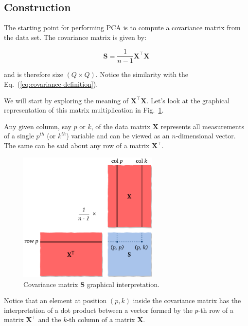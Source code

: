 \documentclass[10pt,twocolumn]{article}
\begin{document}
\subsection{Construction}

The starting point for performing PCA is to compute a covariance matrix from the data set. The covariance matrix is given by:

\begin{equation}\label{eq:cov-matrix}
\mathbf{S} = \frac{1}{n-1} \mathbf{X}^{\top} \mathbf{X}
\end{equation}

and is therefore size $(Q \times Q)$. Notice the similarity with the Eq.~(\ref{eq:covariance-definition}).

We will start by exploring the meaning of $\mathbf{X}^{\top} \mathbf{X}$. Let's look at the graphical representation of this matrix multiplication in Fig.~\ref{fig:covariance-matrix}.

Any given column, say $p$ or $k$, of the data matrix $\mathbf{X}$ represents all measurements of a single $p^{th}$ (or $k^{th}$) variable and can be viewed as an $n$-dimensional vector. The same can be said about any row of a matrix $\mathbf{X}^{\top}$.

\begin{figure}[H]
\centering\includegraphics[width=7cm]{cov-matrix.pdf}
\caption{Covariance matrix $\mathbf{S}$ graphical interpretation.}
\label{fig:covariance-matrix}
\end{figure}

Notice that an element at position $(p,k)$ inside the covariance matrix has the interpretation of a dot product between a vector formed by the $p$-th row of a matrix $\mathbf{X}^{\top}$ and the $k$-th column of a matrix $\mathbf{X}$.
\end{document}
